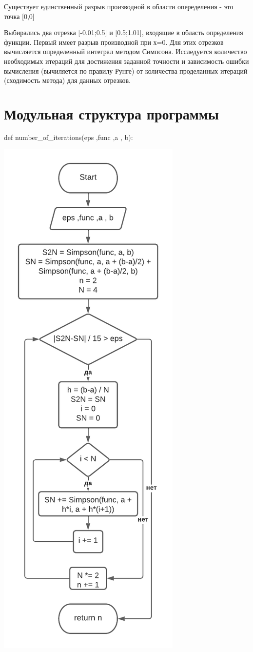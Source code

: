 Существует единственный разрыв производной в области опеределения - это точка [0,0]

Выбирались два отрезка [-0.01;0.5] и [0.5;1.01], входящие в область определения функции. Первый имеет разрыв производной при х=0. Для этих отрезков вычисляется определенный интеграл методом Симпсона. Исследуется количество необходимых итераций для достижения заданной точности и зависимость ошибки вычисления (вычиляется по правилу Рунге) от количества проделанных итераций (сходимость метода) для данных отрезков. 

\section{Модульная структура программы}


def number\_of\_iterations(eps ,func ,a , b):

\includegraphics[scale=0.9]{block3.pdf}


